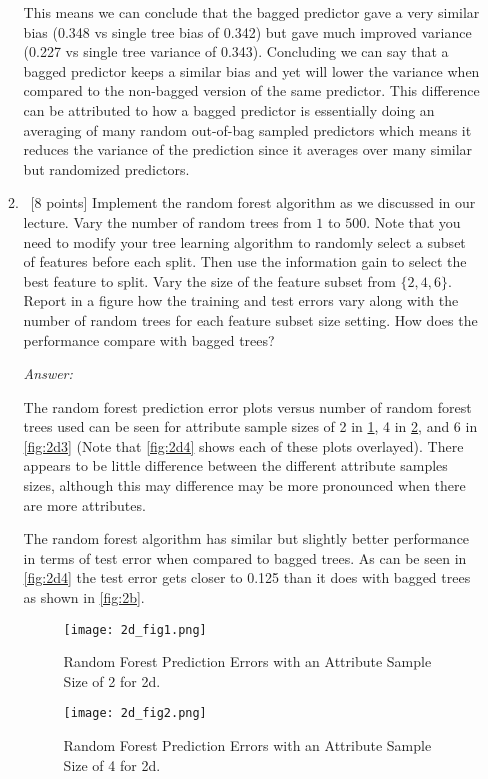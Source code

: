 \documentclass[12pt, fullpage,letterpaper]{article}
\begin{document}
\begin{enumerate}
\begin{enumerate}
	This means we can conclude that the bagged predictor gave a very similar bias (0.348 vs single tree bias of 0.342) but gave much improved variance (0.227 vs single tree variance of 0.343).
	Concluding we can say that a bagged predictor keeps a similar bias and yet will lower the variance when compared to the non-bagged version of the same predictor.
	This difference can be attributed to how a bagged predictor is essentially doing an averaging of many random out-of-bag sampled predictors which means it reduces the variance of the prediction since it averages over many similar but randomized predictors.


	 
	\item~[8 points] Implement the random forest algorithm as we discussed in our lecture. Vary the number of random trees from $1$ to $500$. Note that you need to modify your tree learning algorithm to randomly select a subset of features before each split. Then use the information gain to select the best feature to split.  Vary the size of the feature subset from $\{2, 4, 6\}$.  Report in a figure how the training and test errors vary along with the number of random trees for each feature subset size setting. How does the performance compare with bagged trees? 

	\textit{Answer:}

	The random forest prediction error plots versus number of random forest trees used can be seen for attribute sample sizes of 2 in \ref{fig:2d1}, 4 in \ref{fig:2d2}, and 6 in \ref{fig:2d3} (Note that \ref{fig:2d4} shows each of these plots overlayed).
	There appears to be little difference between the different attribute samples sizes, although this may difference may be more pronounced when there are more attributes.

	The random forest algorithm has similar but slightly better performance in terms of test error when compared to bagged trees.
	As can be seen in \ref{fig:2d4} the test error gets closer to 0.125 than it does with bagged trees as shown in \ref{fig:2b}.

	\begin{figure}[h]
	\begin{center}
	\texttt{[image: 2d\_fig1.png]}
	\end{center}
	\caption{Random Forest Prediction Errors with an Attribute Sample Size of 2 for 2d.}
	\label{fig:2d1}
	\end{figure}

	\begin{figure}[h]
	\begin{center}
	\texttt{[image: 2d\_fig2.png]}
	\end{center}
	\caption{Random Forest Prediction Errors with an Attribute Sample Size of 4 for 2d.}
	\label{fig:2d2}
	\end{figure}


\end{enumerate}
\end{enumerate}
\end{document}
